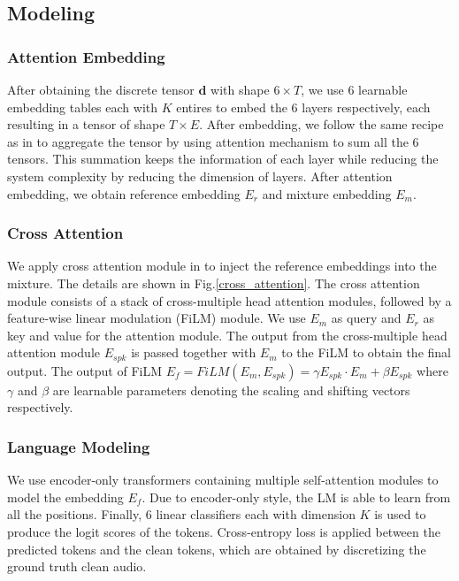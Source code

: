 \documentclass[conference]{IEEEtran}
\begin{document}
\subsection{Modeling}
\subsubsection{Attention Embedding}
After obtaining the discrete tensor \(\bm{d}\) with shape \(6 \times T\), we use 6
learnable embedding tables each with \(K\) entires to embed the 6 layers 
respectively, each resulting in a tensor of shape \(T \times E\). 
After embedding, we follow the same recipe as in \cite{dasb} to 
aggregate the tensor by using attention mechanism to sum all the 6 tensors. This summation 
keeps the information of each layer while reducing the system complexity by reducing the 
dimension of layers. After attention embedding, we obtain reference embedding \(E_r\) and 
mixture embedding \(E_m\).

\subsubsection{Cross Attention}
We apply cross attention module in \cite{usef_tes} to inject the reference embeddings into the mixture. The details 
are shown in Fig.\ref{cross_attention}.
The cross attention module consists of a stack of cross-multiple head attention modules, followed by
a feature-wise linear modulation (FiLM) module. 
We use \(E_m\) as query and \(E_r\) as key and value for 
the attention module. The output from the cross-multiple head attention module \(E_{spk}\)
is passed together with \(E_m\) to the FiLM to obtain the final output. The output of 
FiLM  \(E_f = FiLM(E_m, E_{spk}) = \gamma E_{spk} \cdot E_m  + \beta E_{spk} \) where 
\(\gamma\) and \(\beta\) are learnable parameters denoting the scaling and shifting vectors 
respectively.

\subsubsection{Language Modeling}
We use encoder-only transformers containing multiple self-attention modules to model the 
embedding \(E_f\). Due to encoder-only style, the LM is able to learn from all the positions. 
Finally, 6 linear classifiers each with dimension \(K\) is used to produce the logit scores of the tokens.
Cross-entropy loss is applied between the predicted tokens and the clean tokens, which are obtained by discretizing the ground truth clean audio.
\end{document}
